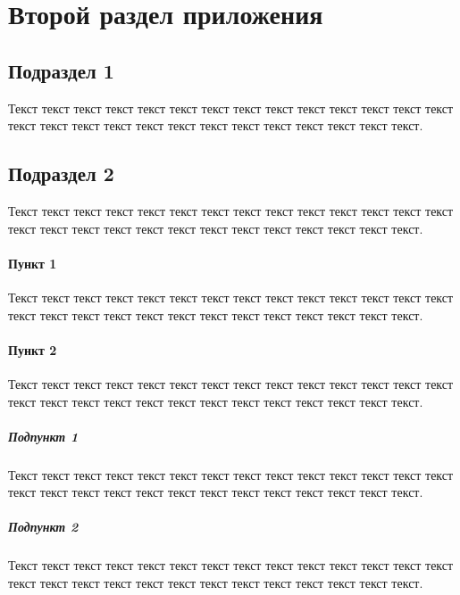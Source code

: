 \newpage
\section{Второй раздел приложения}

\subsection{Подраздел 1}
Текст текст текст текст текст текст текст текст текст текст текст текст текст текст текст текст текст текст текст текст текст текст текст текст текст текст текст.

\subsection{Подраздел 2}
Текст текст текст текст текст текст текст текст текст текст текст текст текст текст текст текст текст текст текст текст текст текст текст текст текст текст текст.

\paragraph{Пункт 1} 
Текст текст текст текст текст текст текст текст текст текст текст текст текст текст текст текст текст текст текст текст текст текст текст текст текст текст текст.

\paragraph{Пункт 2} 
Текст текст текст текст текст текст текст текст текст текст текст текст текст текст текст текст текст текст текст текст текст текст текст текст текст текст текст.

\subparagraph{Подпункт 1} 
Текст текст текст текст текст текст текст текст текст текст текст текст текст текст текст текст текст текст текст текст текст текст текст текст текст текст текст.

\subparagraph{Подпункт 2} 
Текст текст текст текст текст текст текст текст текст текст текст текст текст текст текст текст текст текст текст текст текст текст текст текст текст текст текст.
